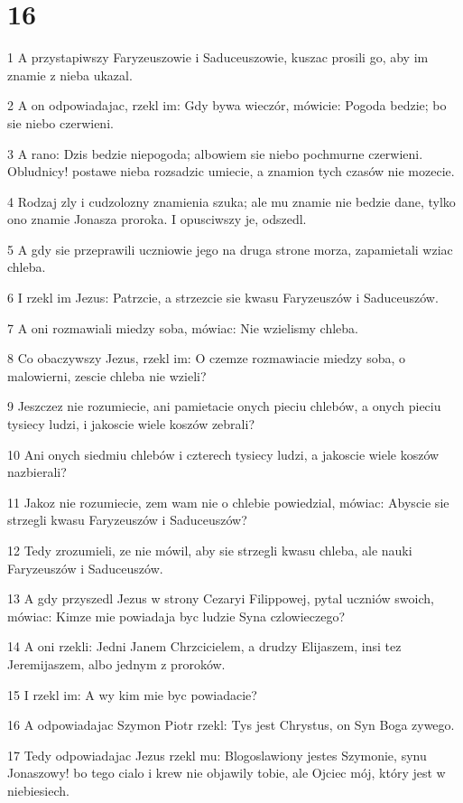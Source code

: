 \chapter{16}

\par 1 A przystapiwszy Faryzeuszowie i Saduceuszowie, kuszac prosili go, aby im znamie z nieba ukazal.
\par 2 A on odpowiadajac, rzekl im: Gdy bywa wieczór, mówicie: Pogoda bedzie; bo sie niebo czerwieni.
\par 3 A rano: Dzis bedzie niepogoda; albowiem sie niebo pochmurne czerwieni. Obludnicy! postawe nieba rozsadzic umiecie, a znamion tych czasów nie mozecie.
\par 4 Rodzaj zly i cudzolozny znamienia szuka; ale mu znamie nie bedzie dane, tylko ono znamie Jonasza proroka. I opusciwszy je, odszedl.
\par 5 A gdy sie przeprawili uczniowie jego na druga strone morza, zapamietali wziac chleba.
\par 6 I rzekl im Jezus: Patrzcie, a strzezcie sie kwasu Faryzeuszów i Saduceuszów.
\par 7 A oni rozmawiali miedzy soba, mówiac: Nie wzielismy chleba.
\par 8 Co obaczywszy Jezus, rzekl im: O czemze rozmawiacie miedzy soba, o malowierni, zescie chleba nie wzieli?
\par 9 Jeszczez nie rozumiecie, ani pamietacie onych pieciu chlebów, a onych pieciu tysiecy ludzi, i jakoscie wiele koszów zebrali?
\par 10 Ani onych siedmiu chlebów i czterech tysiecy ludzi, a jakoscie wiele koszów nazbierali?
\par 11 Jakoz nie rozumiecie, zem wam nie o chlebie powiedzial, mówiac: Abyscie sie strzegli kwasu Faryzeuszów i Saduceuszów?
\par 12 Tedy zrozumieli, ze nie mówil, aby sie strzegli kwasu chleba, ale nauki Faryzeuszów i Saduceuszów.
\par 13 A gdy przyszedl Jezus w strony Cezaryi Filippowej, pytal uczniów swoich, mówiac: Kimze mie powiadaja byc ludzie Syna czlowieczego?
\par 14 A oni rzekli: Jedni Janem Chrzcicielem, a drudzy Elijaszem, insi tez Jeremijaszem, albo jednym z proroków.
\par 15 I rzekl im: A wy kim mie byc powiadacie?
\par 16 A odpowiadajac Szymon Piotr rzekl: Tys jest Chrystus, on Syn Boga zywego.
\par 17 Tedy odpowiadajac Jezus rzekl mu: Blogoslawiony jestes Szymonie, synu Jonaszowy! bo tego cialo i krew nie objawily tobie, ale Ojciec mój, który jest w niebiesiech.
